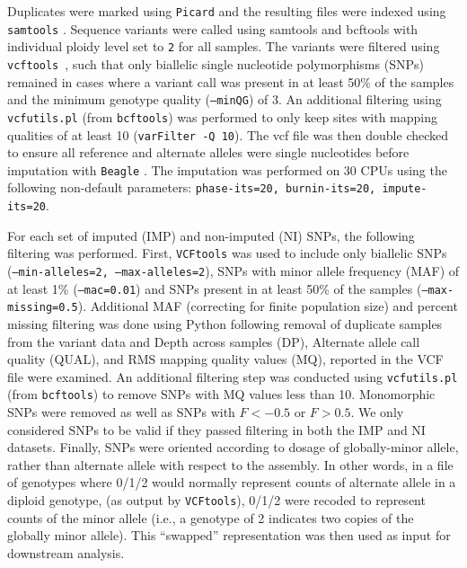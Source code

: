 \documentclass[smallextended]{svjour3}
\begin{document}
Duplicates were marked using \texttt{Picard} and the resulting files were
indexed using \texttt{samtools} \citep[][version 1.2]{Li:2009ka}.  Sequence
variants were called using samtools and bcftools \citep[][version
1.2]{Li:2009ka} with individual  ploidy level set to \texttt{2} for all samples.
The variants were filtered  using \texttt{vcftools}~\citep[][version
0.1.14]{Danecek:2011gz}, such that only biallelic single nucleotide
polymorphisms (SNPs) remained in cases where a variant call was present in at
least 50\% of the samples and the minimum genotype quality (\texttt{--minQG}) of
3. An additional filtering using \texttt{vcfutils.pl} (from \texttt{bcftools})
was performed to only keep sites with mapping qualities of at least 10
(\texttt{varFilter -Q 10}). The vcf file was then double checked to ensure all
reference and alternate alleles were single nucleotides before imputation with
\texttt{Beagle} \citep[][version 4.0, r1399]{Browning:2007ge}.  The imputation
was performed on 30 CPUs using the following non-default parameters:
\texttt{phase-its=20, burnin-its=20, impute-its=20}.

For each set of imputed (IMP) and non-imputed (NI) SNPs, the following filtering
was performed.  First, \texttt{VCFtools} was used to include only biallelic
SNPs (\texttt{--min-alleles=2, --max-alleles=2}), SNPs with minor allele
frequency (MAF) of at least 1\% (\texttt{--mac=0.01}) and SNPs present in at
least 50\% of the samples (\texttt{--max-missing=0.5}).  Additional MAF
(correcting for  finite population size) and percent missing filtering was done
using Python following removal of duplicate samples from the variant data and
Depth across samples (DP), Alternate allele call quality (QUAL), and RMS mapping
quality values (MQ), reported in the VCF file were examined.  An additional
filtering step was conducted using \texttt{vcfutils.pl} (from \texttt{bcftools})
to remove SNPs with MQ values less than 10.  Monomorphic SNPs were removed as
well as SNPs with $F < -0.5$ or $F > 0.5$.  We only considered SNPs
to be valid if they passed filtering in both the IMP and NI datasets. Finally,
SNPs were oriented according to dosage of globally-minor allele, rather than
alternate allele with respect to the assembly. In other words, in a file of
genotypes where 0/1/2 would normally represent counts of alternate allele in a
diploid genotype,  (as output by \texttt{VCFtools}), 0/1/2 were recoded to
represent counts of the minor allele (i.e., a genotype of 2 indicates two copies
of the globally minor allele). This ``swapped'' representation was then used as
input for downstream analysis.
\end{document}
